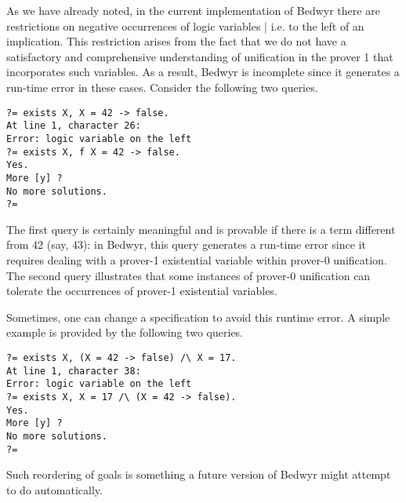 As we have already noted, in the current implementation of Bedwyr
there are restrictions on negative occurrences of logic variables |
i.e. to the left of an implication.
This restriction arises from the fact that we do not
have a satisfactory and comprehensive understanding of unification in
the prover 1 that incorporates such variables.  As a result, Bedwyr
is incomplete since it generates a run-time error in these cases.
Consider the following two queries.
\begin{verbatim}
?= exists X, X = 42 -> false.
At line 1, character 26:
Error: logic variable on the left
?= exists X, f X = 42 -> false.
Yes.
More [y] ?
No more solutions.
?=
\end{verbatim}
The first query is certainly meaningful and is provable if there is a
term different from 42 (say, 43): in Bedwyr, this query generates a
run-time error since it requires dealing with a prover-1
existential variable within prover-0 unification. The second query illustrates
that some instances of prover-0 unification can tolerate the
occurrences of prover-1 existential variables.

Sometimes, one can change a specification to avoid this runtime
error.  A simple example is provided by the following two queries.
\begin{verbatim}
?= exists X, (X = 42 -> false) /\ X = 17.
At line 1, character 38:
Error: logic variable on the left
?= exists X, X = 17 /\ (X = 42 -> false).
Yes.
More [y] ?
No more solutions.
?=
\end{verbatim}
Such reordering of goals is something a future version of Bedwyr might
attempt to do automatically.






